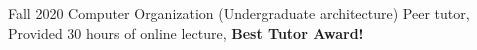 

\begin{cvlist}

  \cvlistitem
    {Fall 2020 Computer Organization (Undergraduate architecture)} %
    {Peer tutor, Provided 30 hours of online lecture, \textbf{Best Tutor Award!}} %

\end{cvlist}
